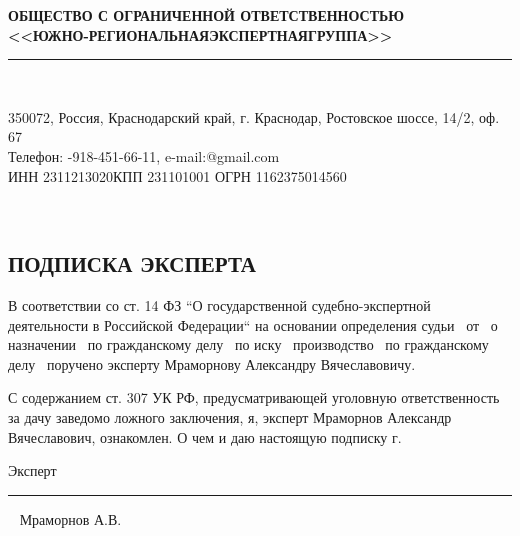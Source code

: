 \setcounter{page}{1}
\pagestyle{empty} %

%
%
\begin{center}
	\normalsize\textbf{ОБЩЕСТВО С ОГРАНИЧЕННОЙ ОТВЕТСТВЕННОСТЬЮ \\[-1.5mm]<<ЮЖНО-РЕГИОНАЛЬНАЯ\quad ЭКСПЕРТНАЯ\quad ГРУППА>> \\[-5mm]}
	\noindent\rule{\textwidth}{1pt}\\[-6mm]  %
\end{center}

\begin{center}
	\begin{footnotesize}
		\vspace{-3.5mm}350072, Россия, Краснодарский край, г. Краснодар, Ростовское шоссе, 14/2, оф. 67\\[0mm]
		Телефон: -918-451-66-11, e-mail:@gmail.com\\ [-2mm]{ИНН 2311213020\quad КПП 231101001 ОГРН 1162375014560}
	\end{footnotesize}	\\[10mm]
\end{center}




\begin{center}
	\section{{\Large \textbf{ПОДПИСКА      ЭКСПЕРТА}}}
\end{center}




В соответствии со ст. 14  ФЗ “О государственной судебно-экспертной деятельности в Российской Федерации“ на основании определения судьи \sud \,  от \dataopr  \, о назначении \opr \, по гражданскому делу \delonum \, по иску \isk \,  производство \opr \, по гражданскому делу \delonum \, поручено эксперту   Мраморнову Александру Вячеславовичу. 

\vspace{5mm}

С содержанием ст. 307 УК РФ, предусматривающей уголовную ответственность за дачу заведомо ложного заключения, я, эксперт Мраморнов Александр Вячеславович, ознакомлен.  О  чем и даю настоящую подписку \datastart г.





\vspace{30mm}

{Эксперт}\hfill      \rule{4cm}{0.1 mm} \,\,\,      {Мраморнов А.В.}
